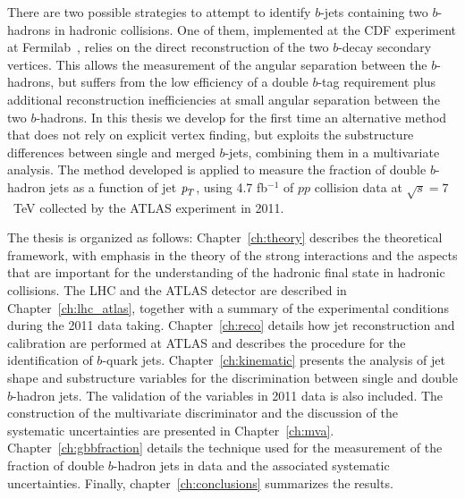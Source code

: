 
 







There are two possible strategies to attempt to identify $b$-jets containing two $b$-hadrons in hadronic collisions. One of them, implemented at the CDF experiment at Fermilab~\cite{CDFAzimutalCorrelation}, relies on the direct reconstruction of the two $b$-decay secondary vertices. This %
allows the measurement of the angular separation between the $b$-hadrons, but suffers from the low efficiency of a double $b$-tag requirement plus additional reconstruction inefficiencies at small angular separation between the two $b$-hadrons. In this thesis we develop for the first time an alternative method that does not rely on explicit vertex finding, but exploits the substructure differences between single and merged $b$-jets, combining them in a multivariate analysis. 
The method developed is applied to measure the fraction of double $b$-hadron jets as a function of jet ${\emph{p}_{T}}$, using 4.7 fb$^{-1}$ of $pp$ collision data at $\sqrt{s}=7$~TeV collected by the ATLAS experiment in 2011.

The thesis is organized as follows: Chapter~\ref{ch:theory} describes the theoretical framework, with emphasis in the theory of the strong interactions and the aspects that are important for the understanding of the hadronic final state in hadronic collisions. The LHC and the ATLAS detector are described in Chapter~\ref{ch:lhc_atlas}, together with a summary of the experimental conditions during the 2011 data taking.  Chapter~\ref{ch:reco} details how jet reconstruction and calibration are performed at ATLAS and describes the procedure for the identification of $b$-quark jets. Chapter~\ref{ch:kinematic} presents the analysis of jet shape and substructure variables for the discrimination between single and double $b$-hadron jets. The validation of the variables in 2011 data is also included.   The construction of the multivariate discriminator  and the discussion of the systematic uncertainties are presented in Chapter~\ref{ch:mva}. 
Chapter~\ref{ch:gbbfraction} details the technique used for the measurement of the fraction of double $b$-hadron jets in data and the associated systematic uncertainties.
Finally, chapter~\ref{ch:conclusions} summarizes the results. 




